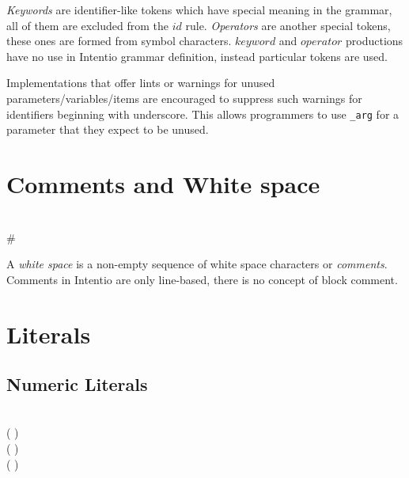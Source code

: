 \emph{Keywords} are identifier-like tokens which have special meaning in the grammar, all of them are excluded from the \(id\) rule. \emph{Operators} are another special tokens, these ones are formed from symbol characters. \(keyword\) and \(operator\) productions have no use in Intentio grammar definition, instead particular tokens are used.

Implementations that offer lints or warnings for unused parameters/variables/items are encouraged to suppress such warnings for identifiers beginning with underscore. This allows programmers to use \texttt{\_arg} for a parameter that they expect to be unused.

\section{Comments and White space}

\begin{bnf}
   \eq {} \\
      \eq \# \  \ 
\end{bnf}

A \emph{white space} is a non-empty sequence of white space characters or \emph{comments}. Comments in Intentio are only line-based, there is no concept of block comment.

\section{Literals}

\begin{bnf}
   \eq {} \gor {} \gor {}
\end{bnf}

\subsection{Numeric Literals}

\begin{bnf}
       \eq {} \  \\
        \eq ( \gor {}) \  \  \\
         \eq ( \gor {}) \  \  \\
   \eq ( \gor {}) \  \  \\
  \\
   \eq {} \gor {} \gor {} \gor {} \\
\end{bnf}

